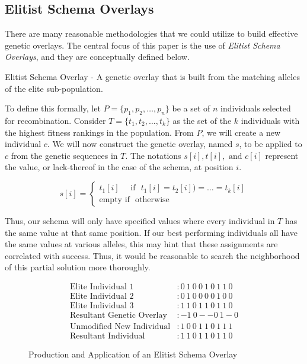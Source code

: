 \subsection*{Elitist Schema Overlays}
There are many reasonable methodologies that we could utilize to build effective genetic overlays. The central focus of this paper is the use of \emph{Elitist Schema Overlays}, and they are conceptually defined below.

\begin{eschema}
Elitist Schema Overlay - A genetic overlay that is built from the matching alleles of the elite sub-population.
\end{eschema}

To define this formally, let $P = \{p_1,p_2,\ldots,p_n\}$ be a set of $n$ individuals selected for recombination. Consider $T=\{t_1,t_2,\ldots,t_k\}$ as the set of the $k$ individuals with the highest fitness rankings in the population. From $P$, we will create a new individual $c$.  We will now construct the genetic overlay, named $s$, to be applied to $c$ from the genetic sequences in $T$. The notations $s[i], t[i], \text{ and } c[i]$ represent the value, or lack-thereof in the case of the schema, at position $i$.
 
 \begin{displaymath}
   s[i] = \left\{
     \begin{array}{lr}
       t_1[i] \text{~~~~if~ } t_1[i] = t_2[i]) = \ldots = t_k[i] \\
       \text{empty~} \text{if~ } \text{otherwise} 
     \end{array}
   \right.
\end{displaymath} 

Thus, our schema will only have specified values where every individual in $T$ has the same value at that same position. If our best performing individuals all have the same values at various alleles, this may hint that these assignments are correlated with success. Thus, it would be reasonable to search the neighborhood of this partial solution more thoroughly. 
\begin{figure}[h!]
\centering 
\begin{align*}
\text{Elite Individual 1} &: 0~1~0~0~1~0~1~1~0 			\\
\text{Elite Individual 2} &: 0~1~0~0~0~0~1~0~0 			\\
\text{Elite Individual 3} &: 1~1~0~1~1~0~1~1~0 			\\
\text{Resultant Genetic Overlay} &:   -1~0--0~1-0			\\
\text{Unmodified New Individual} &: 1~0~0~1~1~0~1~1~1	\\		
\text{Resultant Individual} &: 1~1~0~1~1~0~1~1~0
\end{align*}
\caption{Production and Application of an Elitist Schema Overlay}
\label{ESO-Fig}
\end{figure}

